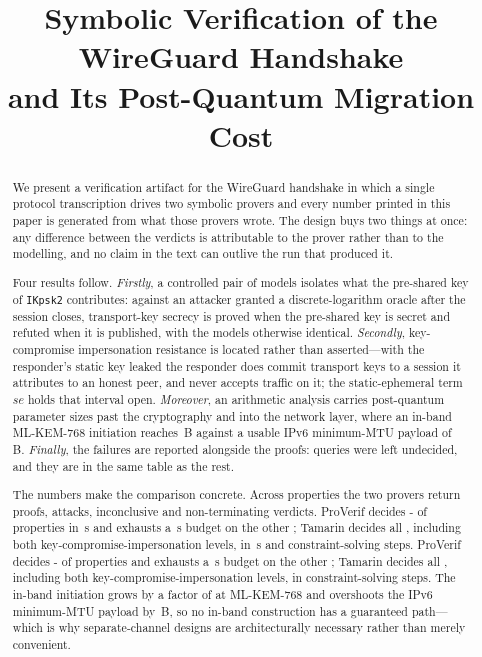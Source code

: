 \documentclass[conference,letterpaper,10pt]{IEEEtran}
\begin{document}
\title{Symbolic Verification of the WireGuard Handshake\\
and Its Post-Quantum Migration Cost}

\author{}

\maketitle

\begin{abstract}
We present a verification artifact for the WireGuard handshake in which a
single protocol transcription drives two symbolic provers and every number
printed in this paper is generated from what those provers wrote. The design
buys two things at once: any difference between the verdicts is attributable
to the prover rather than to the modelling, and no claim in the text can
outlive the run that produced it.

Four results follow. \emph{Firstly}, a controlled pair of models isolates what
the pre-shared key of \texttt{IKpsk2} contributes: against an attacker granted
a discrete-logarithm oracle after the session closes, transport-key secrecy is
proved when the pre-shared key is secret and refuted when it is published,
with the models otherwise identical. \emph{Secondly}, key-compromise
impersonation resistance is located rather than asserted---with the
responder's static key leaked the responder does commit transport keys to a
session it attributes to an honest peer, and never accepts traffic on it; the
static-ephemeral term \(se\) holds that interval open. \emph{Moreover}, an
arithmetic analysis carries post-quantum parameter sizes past the
cryptography and into the network layer, where an in-band ML-KEM-768
initiation reaches \wgKemInit\,B against a usable IPv6 minimum-MTU payload of
\wgIpvsixPayload\,B. \emph{Finally}, the failures are reported alongside the
proofs: \wgNonterm{} queries were left undecided, and they are in the same
table as the rest.

The numbers make the comparison concrete. Across \wgProps{} properties the two
provers return \wgProved{} proofs, \wgAttacks{} attacks, \wgInconcl{}
inconclusive and \wgNonterm{} non-terminating verdicts.
\ifwgtimings
ProVerif decides \the\numexpr\wgPvProps-\wgPvNonterm\relax{} of \wgPvProps{}
properties in \wgPvSpan\,s and exhausts a \wgBudget\,s budget on the other
\wgPvNonterm; Tamarin decides all \wgTamProps, including both
key-compromise-impersonation levels, in \wgTamSpan\,s and \wgTamSteps{}
constraint-solving steps.
\else
ProVerif decides \the\numexpr\wgPvProps-\wgPvNonterm\relax{} of \wgPvProps{}
properties and exhausts a \wgBudget\,s budget on the other \wgPvNonterm;
Tamarin decides all \wgTamProps, including both key-compromise-impersonation
levels, in \wgTamSteps{} constraint-solving steps.
\fi
The in-band initiation grows by a factor of \wgKemGrowth{} at ML-KEM-768 and
overshoots the IPv6 minimum-MTU payload by \wgOvershoot\,B, so no in-band
construction has a guaranteed path---which is why separate-channel designs
are architecturally necessary rather than merely convenient.
\end{abstract}











\end{document}

